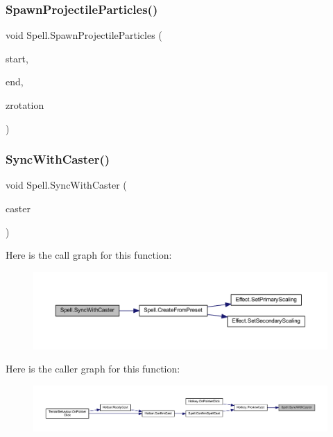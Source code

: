 \mbox{\label{class_spell_aaaea2d98c141ffd0838bac9ac5641349}} 
\subsubsection{\texorpdfstring{SpawnProjectileParticles()}{SpawnProjectileParticles()}}
{\footnotesize\ttfamily void Spell.\+Spawn\+Projectile\+Particles (\begin{DoxyParamCaption}\item[{Vector2\+Int}]{start,  }\item[{Vector2\+Int}]{end,  }\item[{float}]{zrotation }\end{DoxyParamCaption})}

\mbox{\label{class_spell_a65c49405edc86456dfdace46c81b1530}} 
\subsubsection{\texorpdfstring{SyncWithCaster()}{SyncWithCaster()}}
{\footnotesize\ttfamily void Spell.\+Sync\+With\+Caster (\begin{DoxyParamCaption}\item[{\mbox{\hyperlink{class_base_unit}{Base\+Unit}}}]{caster }\end{DoxyParamCaption})}

Here is the call graph for this function\+:\nopagebreak
\begin{figure}[H]
\begin{center}
\leavevmode
\includegraphics[width=350pt]{class_spell_a65c49405edc86456dfdace46c81b1530_cgraph}
\end{center}
\end{figure}
Here is the caller graph for this function\+:\nopagebreak
\begin{figure}[H]
\begin{center}
\leavevmode
\includegraphics[width=350pt]{class_spell_a65c49405edc86456dfdace46c81b1530_icgraph}
\end{center}
\end{figure}



